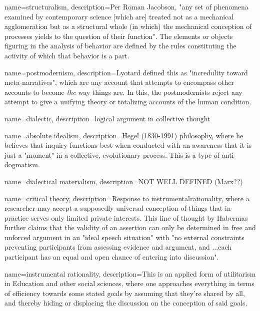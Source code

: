 {
	name={structuralism},
	description={Per Roman Jacobson, "any set of phenomena examined by contemporary science [which are] treated not as a mechanical agglomeration but as a structural whole (in which) the mechanical conception of processes yields to the question of their function". The elements or objects figuring in the analysis of behavior are defined by the rules constituting the activity of which that behavior is a part.  \parencite{bredo_philosophies_2006}}
}


{
	name={postmodernism},
	description={Lyotard defined this as "incredulity toward meta-narratives", which are any account that attempts to encompass other accounts to become \emph{the} way things are. In this, the postmodernists reject any attempt to give a unifying theory or totalizing accounts of the human condition.  \parencite{bredo_philosophies_2006}}
}


{
	name={dialectic},
	description={logical argument in collective thought \parencite{bredo_philosophies_2006}}
}

{
	name={absolute idealism},
	description={Hegel (1830-1991) philosophy, where he believes that inquiry functions best when conducted with an awareness that it is just a "moment" in a collective, evolutionary process. This is a type of anti-dogmatism. \parencite{bredo_philosophies_2006}}
}


{
	name={dialectical materialism},
	description={NOT WELL DEFINED (Marx??) \parencite{bredo_philosophies_2006}}
} 
 
 
{
	name={critical theory},
	description={Response to \gls{instrumentalrationality}, where a researcher may accept a supposedly universal conception of things that in practice serves only limited private interests. This line of thought by Habermas further claims that the validity of an assertion can only be determined in free and unforced argument in an "ideal speech situation" with "no external constraints preventing participants from assessing evidence and argument, and ...each participant has an equal and open chance of entering into discussion". \parencite{bredo_philosophies_2006}}
}

{
	name={instrumental rationality},
	description={This is an applied form of utilitarism in Education and other social sciences, where one approaches everything in terms of efficiency towards some stated goals by assuming that they're shared by all, and thereby hiding or displacing the discussion on the conception of said goals. \parencite{bredo_philosophies_2006}}
}

